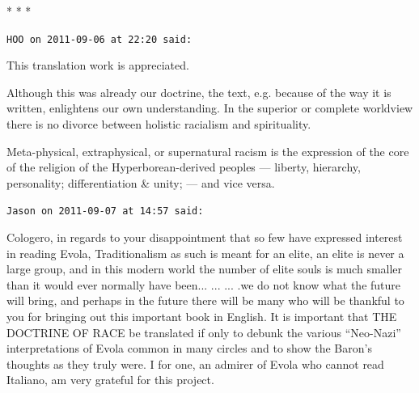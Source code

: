 
\begin{center}* * *\end{center}

\begin{footnotesize}
\begin{sffamily}
\texttt{HOO on 2011-09-06 at 22:20 said:}

This translation work is appreciated.

Although this was already our doctrine, the text, e.g. because of the way it is written, enlightens our own understanding. In the superior or complete worldview there is no divorce between holistic racialism and spirituality.

Meta-physical, extraphysical, or supernatural racism is the expression of the core of the religion of the Hyperborean-derived peoples --- liberty, hierarchy, personality; differentiation \& unity; --- and vice versa.

\hfill

\texttt{Jason on 2011-09-07 at 14:57 said:}

Cologero, in regards to your disappointment that so few have expressed interest in reading Evola, Traditionalism as such is meant for an elite, an elite is never a large group, and in this modern world the number of elite souls is much smaller than it would ever normally have been... ... ... .we do not know what the future will bring, and perhaps in the future there will be many who will be thankful to you for bringing out this important book in English. It is important that THE DOCTRINE OF RACE be translated if only to debunk the various ``Neo-Nazi'' interpretations of Evola common in many circles and to show the Baron's thoughts as they truly were. I for one, an admirer of Evola who cannot read Italiano, am very grateful for this project.


\hfill

\end{sffamily}
\end{footnotesize}

